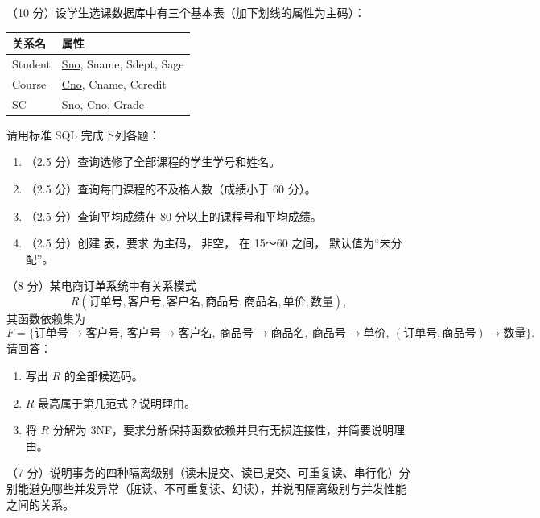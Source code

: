 \documentclass[a4paper,11pt]{article}
\begin{document}
\q （10 分）设学生选课数据库中有三个基本表（加下划线的属性为主码）：
\begin{center}\small
\begin{tabular}{ll}
\toprule
关系名 & 属性 \\
\midrule
Student & \underline{Sno}, Sname, Sdept, Sage \\
Course & \underline{Cno}, Cname, Ccredit \\
SC & \underline{Sno}, \underline{Cno}, Grade \\
\bottomrule
\end{tabular}
\end{center}
请用标准 SQL 完成下列各题：
\begin{enumerate}[label=（\arabic*）, leftmargin=2.4em, itemsep=1pt]
  \item （2.5 分）查询选修了全部课程的学生学号和姓名。
  \item （2.5 分）查询每门课程的不及格人数（成绩小于 60 分）。
  \item （2.5 分）查询平均成绩在 80 分以上的课程号和平均成绩。
  \item （2.5 分）创建  表，要求  为主码， 非空， 在 15～60 之间， 默认值为“未分配”。
\end{enumerate}
\anslines{9cm}

\q （8 分）某电商订单系统中有关系模式
\[
R(\text{订单号},\text{客户号},\text{客户名},\text{商品号},\text{商品名},\text{单价},\text{数量}),
\]
其函数依赖集为
\[
F=\{\text{订单号}\to\text{客户号},\ \text{客户号}\to\text{客户名},\ \text{商品号}\to\text{商品名},\ \text{商品号}\to\text{单价},\ (\text{订单号},\text{商品号})\to\text{数量}\}.
\]
请回答：
\begin{enumerate}[label=（\arabic*）, leftmargin=2.4em, itemsep=1pt]
  \item 写出 $R$ 的全部候选码。
  \item $R$ 最高属于第几范式？说明理由。
  \item 将 $R$ 分解为 3NF，要求分解保持函数依赖并具有无损连接性，并简要说明理由。
\end{enumerate}
\anslines{7cm}

\q （7 分）说明事务的四种隔离级别（读未提交、读已提交、可重复读、串行化）分别能避免哪些并发异常（脏读、不可重复读、幻读），并说明隔离级别与并发性能之间的关系。
\anslines{7cm}

\end{document}
